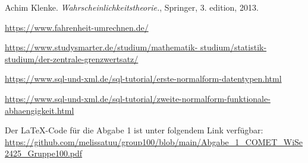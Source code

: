 \documentclass[a4paper, 12pt]{article}
\begin{document}
\newpage

\begin{thebibliography}{9}
    Achim Klenke. \textit{Wahrscheinlichkeitstheorie.}, Springer, 3. edition, 2013.

    \href{https://www.fahrenheit-umrechnen.de/}{https://www.fahrenheit-umrechnen.de/}

    \href{https://www.studysmarter.de/studium/mathematik-studium/statistik-studium/der-zentrale-grenzwertsatz/}{https://www.studysmarter.de/studium/mathematik-
    studium/statistik-studium/der-zentrale-grenzwertsatz/}

    \href{https://www.sql-und-xml.de/sql-tutorial/erste-normalform-datentypen.html}{https://www.sql-und-xml.de/sql-tutorial/erste-normalform-datentypen.html}

    \href{https://www.sql-und-xml.de/sql-tutorial/zweite-normalform-funktionale-abhaengigkeit.html}{https://www.sql-und-xml.de/sql-tutorial/zweite-normalform-funktionale-abhaengigkeit.html}

    \vspace{\baselineskip}
    Der LaTeX-Code für die Abgabe 1 ist unter 
    folgendem Link verfügbar:
    \url{https://github.com/melissatuu/group100/blob/main/Abgabe_1_COMET_WiSe2425_Gruppe100.pdf}

\end{thebibliography}
\end{document}
